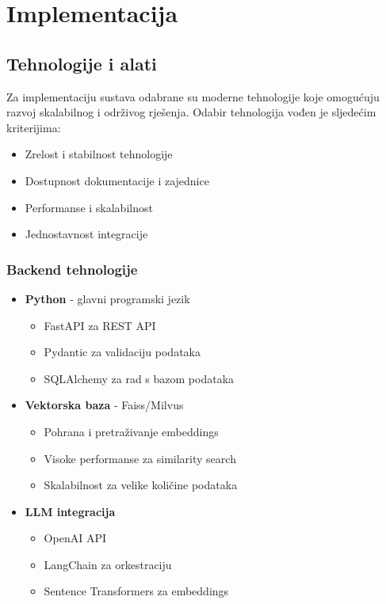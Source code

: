\chapter{Implementacija}
\label{ch:implementation}


\section{Tehnologije i alati}
\label{sec:technologies}

Za implementaciju sustava odabrane su moderne tehnologije koje omogućuju razvoj 
skalabilnog i održivog rješenja. Odabir tehnologija vođen je sljedećim kriterijima:
\begin{itemize}
    \item Zrelost i stabilnost tehnologije
    \item Dostupnost dokumentacije i zajednice
    \item Performanse i skalabilnost
    \item Jednostavnost integracije
\end{itemize}

\subsection{Backend tehnologije}
\begin{itemize}
    \item \textbf{Python} - glavni programski jezik
    \begin{itemize}
        \item FastAPI za REST API
        \item Pydantic za validaciju podataka
        \item SQLAlchemy za rad s bazom podataka
    \end{itemize}
    
    \item \textbf{Vektorska baza} - Faiss/Milvus
    \begin{itemize}
        \item Pohrana i pretraživanje embeddings
        \item Visoke performanse za similarity search
        \item Skalabilnost za velike količine podataka
    \end{itemize}
    
    \item \textbf{LLM integracija}
    \begin{itemize}
        \item OpenAI API
        \item LangChain za orkestraciju
        \item Sentence Transformers za embeddings
    \end{itemize}
\end{itemize}

